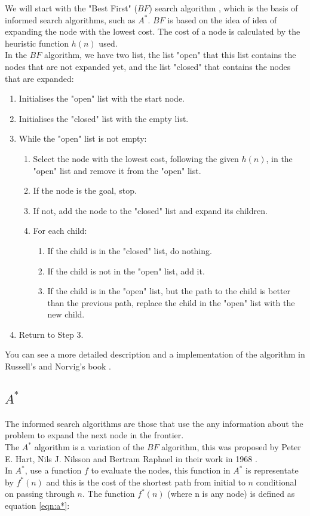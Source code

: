 \documentclass[runningheads]{llncs}
\begin{document}
We will start with the "Best First" (\(BF\)) search algorithm \cite{algorithms}, which is the basis of informed search algorithms, such as \(A^*\).
\(BF\) is based on the idea of idea of expanding the node with the lowest cost. The cost of a node is calculated by the heuristic function \(h(n)\) used. \\
In the \(BF\) algorithm, we have two list, the list "open" that this list contains the nodes that are not expanded yet, and the list "closed" that contains the nodes that are expanded:
\begin{enumerate}
\item Initialises the "open" list with the start node.
\item Initialises the "closed" list with the empty list.
\item While the "open" list is not empty:
\begin{enumerate}
\item Select the node with the lowest cost, following the given \(h(n)\), in the "open" list and remove it from the "open" list.
\item If the node is the goal, stop.
\item If not, add the node to the "closed" list and expand its children.
\item For each child:
\begin{enumerate}
\item If the child is in the "closed" list, do nothing.
\item If the child is not in the "open" list, add it.
\item If the child is in the "open" list, but the path to the child is better than the previous path, replace the child in the "open" list with the new child.
\end{enumerate}
\end{enumerate}
\item Return to Step 3.
\end{enumerate}
You can see a more detailed description and a implementation of the algorithm in Russell's and Norvig's book \cite{algorithms_2}.

\subsection{\(A^*\)}

The informed search algorithms are those that use the any information about the problem to expand the next node in the frontier.\\
The \(A^*\) algorithm is a variation of the \(BF\) algorithm, this was proposed by Peter E. Hart, Nils J. Nilsson and Bertram Raphael in their work in 1968 \cite{algorithms_3}.\\
In \(A^*\), use a function \(f\) to evaluate the nodes, this function in \(A^*\) is representate by \(f^*(n)\) and this is the cost of the shortest path from initial to \(n\) conditional on passing through \(n\).
The function \(f^*(n)\) (where n is any node) is defined as equation \ref{eqn:a*}:
\end{document}
